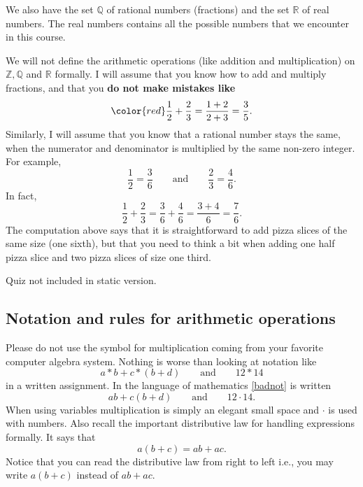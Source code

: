 We also have
the set $\mathbb{Q}$ of rational numbers (fractions) and the set
$\mathbb{R}$ of real numbers. The real numbers
contains all the possible numbers that we encounter in
this course.

We will not define the
arithmetic operations (like addition and multiplication) on $\mathbb{Z}, \mathbb{Q}$
and $\mathbb{R}$
formally. I will assume that you know how to add and multiply fractions,
and that you \textbf{do not make mistakes like}
$$
  \color{red}
  \frac{1}{2} + \frac{2}{3} = \frac{1+2}{2+3}=\frac{3}{5}.
$$
Similarly, I will assume that you know that a rational number stays the
same, when the numerator and denominator is multiplied by the same non-zero
integer. For example,
$$
  \frac{1}{2} = \frac{3}{6}\qquad\text{and}\qquad \frac{2}{3} = \frac{4}{6}.
$$
In fact,
$$
  \frac{1}{2} + \frac{2}{3} = \frac{3}{6} + \frac{4}{6} = \frac{3 + 4}{6} = \frac{7}{6}.
$$
The computation above says that it is straightforward to add pizza slices of the
same size (one sixth), but that you need to think a bit when adding one half pizza slice and
two pizza slices of size one third.

\begin{quizexercise} Quiz not included in static version.\end{quizexercise}

\subsection{Notation and rules for arithmetic operations}

Please do not use the symbol for multiplication coming from your favorite computer algebra system. Nothing is worse than looking at notation like
\begin{equation}\label{badnot}
  a*b + c*(b+d)\qquad \text{and}\qquad 12*14
\end{equation}
in a written assignment. In the language of mathematics \eqref{badnot} is written
\begin{equation}
  a b + c (b+d)\qquad \text{and}\qquad 12\cdot 14.
\end{equation}
When using variables multiplication is simply an elegant small space and $\cdot$ is
used with numbers. Also recall the important distributive law for handling
expressions formally. It says that
\begin{equation}\label{distrlaw}
  a (b + c) = a b + a c.
\end{equation}
Notice that you can read the distributive law from right to left i.e., you
may write $a (b + c)$ instead of $a b + a c$.

